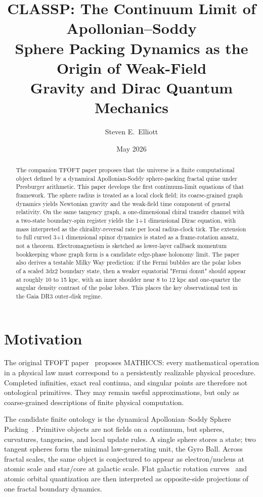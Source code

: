 \documentclass[11pt,a4paper]{article}
\title{CLASSP: The Continuum Limit of Apollonian--Soddy\\
Sphere Packing Dynamics as the Origin of Weak-Field\\
Gravity and Dirac Quantum Mechanics}
\author{Steven E.\ Elliott}
\date{May 2026}
\begin{document}
\maketitle

\begin{abstract}
The companion TFOFT paper proposes that the universe is a finite computational object defined by a dynamical Apollonian-Soddy sphere-packing fractal quine under Presburger arithmetic. This paper develops the first continuum-limit equations of that framework. The sphere radius is treated as a local clock field; its coarse-grained graph dynamics yields Newtonian gravity and the weak-field time component of general relativity. On the same tangency graph, a one-dimensional chiral transfer channel with a two-state boundary-spin register yields the 1+1 dimensional Dirac equation, with mass interpreted as the chirality-reversal rate per local radius-clock tick. The extension to full curved 3+1 dimensional spinor dynamics is stated as a frame-rotation ansatz, not a theorem. Electromagnetism is sketched as lower-layer callback momentum bookkeeping whose graph form is a candidate edge-phase holonomy limit. The paper also derives a testable Milky Way prediction: if the Fermi bubbles are the polar lobes of a scaled 3dz2 boundary state, then a weaker equatorial "Fermi donut" should appear at roughly 10 to 15 kpc, with an inner shoulder near 8 to 12 kpc and one-quarter the angular density contrast of the polar lobes. This places the key observational test in the Gaia DR3 outer-disk regime.

\end{abstract}
\tableofcontents
\newpage

\section{Motivation}

The original TFOFT paper~\cite{TFOFT2026} proposes MATHICCS: every
mathematical operation in a physical law must correspond to a persistently
realizable physical procedure. Completed infinities, exact real continua, and
singular points are therefore not ontological primitives. They may remain
useful approximations, but only as coarse-grained descriptions of finite
physical computation.

The candidate finite ontology is the dynamical Apollonian--Soddy Sphere
Packing~\cite{Soddy1936,Boyd1973,Graham2003}. Primitive objects are not fields
on a continuum, but spheres, curvatures, tangencies, and local update rules. A
single sphere stores a state; two tangent spheres form the minimal
law-generating unit, the Gyro Ball. Across fractal scales, the same object is
conjectured to appear as electron/nucleus at atomic scale and star/core at
galactic scale. Flat galactic rotation curves~\cite{Sofue2012,Chemin2009} and
atomic orbital quantization are then interpreted as opposite-side projections
of one fractal boundary dynamics.
\end{document}
